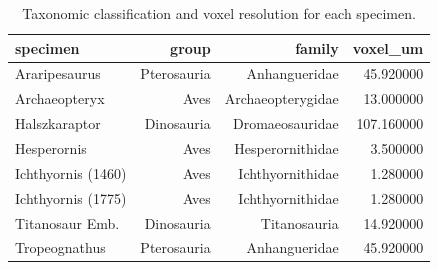 \begin{table}[htbp]
\caption{Taxonomic classification and voxel resolution for each specimen.}
\label{tab:taxonomy}
\begin{tabular}{lrrr}
\toprule
specimen & group & family & voxel\_um \\
\midrule
Araripesaurus & Pterosauria & Anhangueridae & 45.920000 \\
Archaeopteryx & Aves & Archaeopterygidae & 13.000000 \\
Halszkaraptor & Dinosauria & Dromaeosauridae & 107.160000 \\
Hesperornis & Aves & Hesperornithidae & 3.500000 \\
Ichthyornis (1460) & Aves & Ichthyornithidae & 1.280000 \\
Ichthyornis (1775) & Aves & Ichthyornithidae & 1.280000 \\
Titanosaur Emb. & Dinosauria & Titanosauria & 14.920000 \\
Tropeognathus & Pterosauria & Anhangueridae & 45.920000 \\
\bottomrule
\end{tabular}
\end{table}
